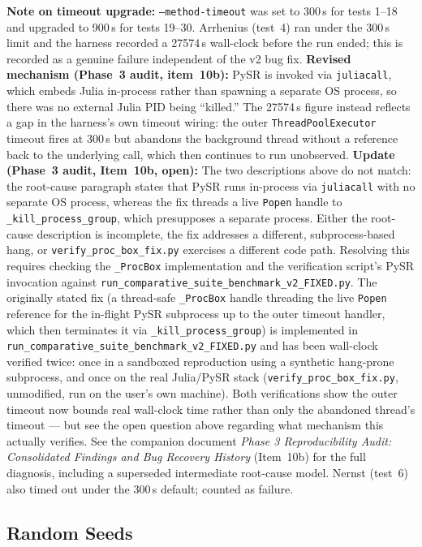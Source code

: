 \documentclass[twoside,11pt]{article}
\begin{document}
\textbf{Note on timeout upgrade:} \texttt{--method-timeout} was set to 300\,s
for tests 1--18 and upgraded to 900\,s for tests 19--30. Arrhenius (test~4)
ran under the 300\,s limit and the harness recorded a 27574\,s wall-clock
before the run ended; this is recorded as a genuine failure independent of
the v2 bug fix. \textbf{Revised mechanism (Phase~3 audit, item~10b):} PySR is
invoked via \texttt{juliacall}, which embeds Julia in-process rather than
spawning a separate OS process, so there was no external Julia PID being
``killed.'' The 27574\,s figure instead reflects a gap in the harness's own
timeout wiring: the outer \texttt{ThreadPoolExecutor} timeout fires at
300\,s but abandons the background thread without a reference back to the
underlying call, which then continues to run unobserved. \textbf{Update
(Phase~3 audit, Item~10b, open):} The two descriptions above do not match: the root-cause paragraph states that PySR runs in-process via \texttt{juliacall} with no separate OS process, whereas the fix threads a live \texttt{Popen} handle to \texttt{\_kill\_process\_group}, which presupposes a separate process. Either the root-cause description is incomplete, the fix addresses a different, subprocess-based hang, or \texttt{verify\_proc\_box\_fix.py} exercises a different code path. Resolving this requires checking the \texttt{\_ProcBox} implementation and the verification script's PySR invocation against \texttt{run\_comparative\_suite\_benchmark\_v2\_FIXED.py}. The originally
stated fix (a thread-safe \texttt{\_ProcBox}
handle threading the live \texttt{Popen} reference for the in-flight PySR
subprocess up to the outer timeout handler, which then terminates it via
\texttt{\_kill\_process\_group}) is implemented in
\texttt{run\_comparative\_suite\_benchmark\_v2\_FIXED.py} and has been
wall-clock verified twice: once in a sandboxed reproduction using a
synthetic hang-prone subprocess, and once on the real Julia/PySR stack
(\texttt{verify\_proc\_box\_fix.py}, unmodified, run on the user's own
machine). Both verifications show the outer timeout now bounds real
wall-clock time rather than only the abandoned thread's timeout --- but
see the open question above regarding what mechanism this
actually verifies. See the
companion document \emph{Phase 3 Reproducibility Audit: Consolidated
Findings and Bug Recovery History} (Item~10b) for the
full diagnosis, including a superseded intermediate root-cause model.
Nernst (test~6) also timed out under the 300\,s default; counted as failure.

\subsection*{Random Seeds}
\end{document}
